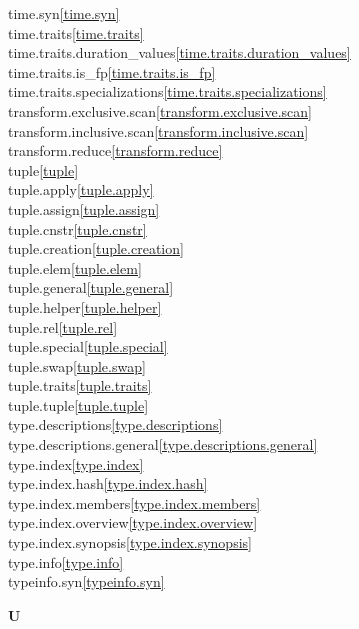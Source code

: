 \begin{multicols}{2}
time.syn\quad\ref{time.syn}\\
time.traits\quad\ref{time.traits}\\
time.traits.duration_values\quad\ref{time.traits.duration_values}\\
time.traits.is_fp\quad\ref{time.traits.is_fp}\\
time.traits.specializations\quad\ref{time.traits.specializations}\\
transform.exclusive.scan\quad\ref{transform.exclusive.scan}\\
transform.inclusive.scan\quad\ref{transform.inclusive.scan}\\
transform.reduce\quad\ref{transform.reduce}\\
tuple\quad\ref{tuple}\\
tuple.apply\quad\ref{tuple.apply}\\
tuple.assign\quad\ref{tuple.assign}\\
tuple.cnstr\quad\ref{tuple.cnstr}\\
tuple.creation\quad\ref{tuple.creation}\\
tuple.elem\quad\ref{tuple.elem}\\
tuple.general\quad\ref{tuple.general}\\
tuple.helper\quad\ref{tuple.helper}\\
tuple.rel\quad\ref{tuple.rel}\\
tuple.special\quad\ref{tuple.special}\\
tuple.swap\quad\ref{tuple.swap}\\
tuple.traits\quad\ref{tuple.traits}\\
tuple.tuple\quad\ref{tuple.tuple}\\
type.descriptions\quad\ref{type.descriptions}\\
type.descriptions.general\quad\ref{type.descriptions.general}\\
type.index\quad\ref{type.index}\\
type.index.hash\quad\ref{type.index.hash}\\
type.index.members\quad\ref{type.index.members}\\
type.index.overview\quad\ref{type.index.overview}\\
type.index.synopsis\quad\ref{type.index.synopsis}\\
type.info\quad\ref{type.info}\\
typeinfo.syn\quad\ref{typeinfo.syn}\\
\par \textbf{U}\par

\end{multicols}
